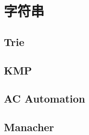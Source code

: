 \section{字符串}

\subsection{Trie}

\subsection{KMP}

\subsection{AC Automation}

\subsection{Manacher}